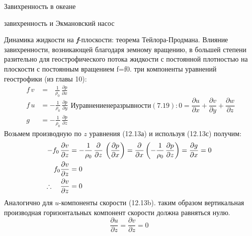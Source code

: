 \begin{chapter}{Завихренность в океане}
\begin{section}{завихренность и Экмановский насос}
\begin{paragraph}{Динамика жидкости на \textbf{\textit{f}}-плоскости: 
теорема Тейлора-Продмана.}
%
Влияние завихренности, возникающей благодаря земному вращению, в
большей степени разительно для геострофического потока жидкости с
постоянной плотностью на плоскости с постоянным вращением f=f0. три
компоненты уравнений геострофики (из главы 10):
\begin{subequations}
\begin{align}
f\,v &= \;\;\, \frac{1}{\rho_{0}}\,\frac{\partial{p}}{\partial{x}} \\
f\,u  &= -\frac{1}{\rho_{0}}\,\frac{\partial{p}}{\partial{y}} \\
g     &= -\frac{1}{\rho_{0}}\,\frac{\partial{p}}{\partial{z}}
\end{align}
И уравнение неразрывности (7.19):
\begin{equation}
0 = \frac{\partial{u}}{\partial{x}} + \frac{\partial{v}}{\partial{y}} +
\frac{\partial{w}}{\partial{z}}
\end{equation}
\end{subequations}
Возьмем производную по $z$ уравнения (12.13а) и используя (12.13с) получим:
\begin{align}
-f_0\,\frac{\partial{v}}{\partial{z}} &= -\frac{1}{\rho_{0}}\,\frac{\partial
}{\partial{z}}\,
\left(\frac{\partial{p}}{\partial{x}}\right) = \frac{\partial
}{\partial{x}}\left(-\frac{1}{\rho_{0}}\,\frac{\partial{p}}{\partial{z}}\right) =
\frac{\partial g}{\partial x}= 0
\notag \\
 f_{0} \frac{\partial{v}}{\partial{z}} &= 0 \notag \\
\therefore \quad \frac{\partial{v}}{\partial{z}} &= 0 \notag
\end{align}
Аналогично для $u$-компоненты скорости (12.13b). таким образом
вертикальная производная горизонтальных компонент скорости должна
равняться нулю.
\begin{equation}
\boxed{ \frac{\partial{u}}{\partial{z}} = \frac{\partial{v}}{\partial{z}} =0  }
\end{equation}
%

\end{paragraph}
\end{section}
\end{chapter}
